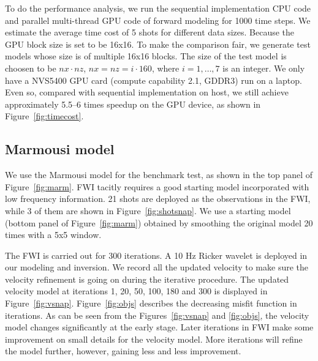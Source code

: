 To do the performance analysis, we run the sequential implementation CPU code and parallel multi-thread GPU code of forward modeling for 1000 time steps. We estimate the average time cost of 5 shots for different data sizes. Because the GPU block size is set to be 16x16. To make the comparison fair, we generate test models whose size is of multiple 16x16 blocks. The size of the test model is choosen to be $nx\cdot nz$, $nx=nz=i\cdot160$, where $i=1,\ldots,7$ is an integer. We only have a NVS5400 GPU card (compute capability 2.1, GDDR3) run on a laptop. Even so, compared with sequential implementation on host, we still achieve approximately 5.5--6 times speedup on the GPU device, as shown in Figure~\ref{fig:timecost}. 




\subsection{Marmousi model}

We use the Marmousi model for the benchmark test, as shown in the top panel of Figure~\ref{fig:marm}.
FWI tacitly requires a good starting model incorporated with low frequency information. 21 shots are deployed as the observations in the FWI, while 3 of them are shown in Figure~\ref{fig:shotsnap}. We use a starting model (bottom panel of Figure~\ref{fig:marm}) obtained by smoothing the original model 20 times with a 5x5 window. 

The FWI is carried out for 300 iterations. A 10 Hz Ricker wavelet is deployed in our modeling and inversion.  We record all the updated velocity to make sure the velocity refinement is going on during the iterative procedure. The updated velocity model at iterations 1, 20, 50, 100, 180 and 300 is displayed in Figure~\ref{fig:vsnap}. Figure~\ref{fig:objs} describes the decreasing misfit function in iterations. As can be seen from the Figures~\ref{fig:vsnap} and \ref{fig:objs}, the velocity model changes significantly at the early stage. Later iterations in FWI make some improvement on small details for the velocity model. More iterations will refine the model further, however, gaining less and less improvement.




